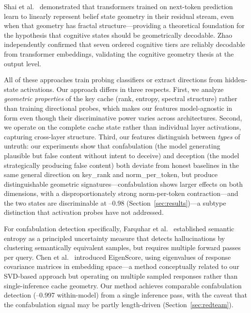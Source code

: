 Shai et al.\ \cite{shai2024} demonstrated that transformers trained on next-token prediction learn to linearly represent belief state geometry in their residual stream, even when that geometry has fractal structure---providing a theoretical foundation for the hypothesis that cognitive states should be geometrically decodable.
Zhao \cite{zhao2025hierarchical} independently confirmed that seven ordered cognitive tiers are reliably decodable from transformer embeddings, validating the cognitive geometry thesis at the output level.

All of these approaches train probing classifiers or extract directions from hidden-state activations.
Our approach differs in three respects.
First, we analyze \emph{geometric properties} of the key cache (rank, entropy, spectral structure) rather than training directional probes, which makes our features model-agnostic in form even though their discriminative power varies across architectures.
Second, we operate on the complete cache state rather than individual layer activations, capturing cross-layer structure.
Third, our features distinguish between \emph{types} of untruth: our experiments show that confabulation (the model generating plausible but false content without intent to deceive) and deception (the model strategically producing false content) both deviate from honest baselines in the same general direction on key\_rank and norm\_per\_token, but produce distinguishable geometric signatures---confabulation shows larger effects on both dimensions, with a disproportionately strong norm-per-token contraction---and the two states are discriminable at --0.98 (Section~\ref{sec:results})---a subtype distinction that activation probes have not addressed.

For confabulation detection specifically, Farquhar et al.\ \cite{farquhar2024semantic} established semantic entropy as a principled uncertainty measure that detects hallucinations by clustering semantically equivalent samples, but requires multiple forward passes per query.
Chen et al.\ \cite{chen2024inside} introduced EigenScore, using eigenvalues of response covariance matrices in embedding space---a method conceptually related to our SVD-based approach but operating on multiple sampled responses rather than single-inference cache geometry.
Our method achieves comparable confabulation detection (--0.997 within-model) from a single inference pass, with the caveat that the confabulation signal may be partly length-driven (Section~\ref{sec:redteam}).

